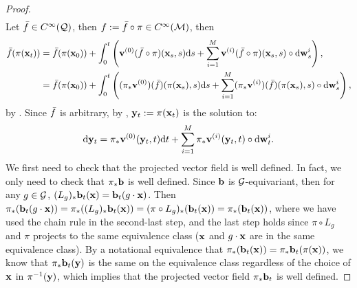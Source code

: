 \begin{proof}
\begin{align}
    \end{align}
    Let $\bar{f}\in C^\infty(\mathcal{Q})$, then $f := \bar{f}\circ\pi\in C^\infty(\mathcal{M})$, then 
    \begin{align}
        \bar{f}(\pi(\mathbf{x}_t))
        &=\bar{f}(\pi(\mathbf{x}_0))+\int_0^t\left(\mathbf{v}^{(0)}(\bar{f}\circ\pi)(\mathbf{x}_s,s)\mathrm{d} s+\sum_{i=1}^M \mathbf{v}^{(i)}(\bar{f}\circ\pi)(\mathbf{x}_s,s)\circ\mathrm{d} \mathbf{w}_s^i\right),\\
        &=\bar{f}(\pi(\mathbf{x}_0))+\int_0^t\left((\pi_*\mathbf{v}^{(0)})(\bar{f})(\pi(\mathbf{x}_s),s)\mathrm{d} s+\sum_{i=1}^M(\pi_*\mathbf{v}^{(i)})(\bar{f})(\pi(\mathbf{x}_s),s)\circ\mathrm{d} \mathbf{w}_s^i\right),
    \end{align}
    by . Since $\bar{f}$ is arbitrary, by , $\mathbf{y}_t:=\pi(\mathbf{x}_t)$ is the solution to:
    \begin{align}
        \mathrm{d}\mathbf{y}_t=\pi_*\mathbf{v}^{(0)}(\mathbf{y}_t,t)\mathrm{d} t+\sum_{i=1}^{M}\pi_*\mathbf{v}^{(i)}(\mathbf{y}_t,t)\circ\mathrm{d} \mathbf{w}_t^i.
    \end{align}
    We first need to check that the projected vector field is well defined. In fact, we only need to check that $\pi_*\mathbf{b}$ is well defined. Since $\mathbf{b}$ is $\mathcal{G}$-equivariant, then for any $g\in\mathcal{G}$,
    $(L_g)_*\mathbf{b}_t(\mathbf{x})=\mathbf{b}_t(g\cdot\mathbf{x})$. Then $\pi_*(\mathbf{b}_t(g\cdot\mathbf{x}))=\pi_*((L_g)_*\mathbf{b}_t(\mathbf{x}))=(\pi\circ L_g)_*(\mathbf{b}_t(\mathbf{x})) = \pi_*(\mathbf{b}_t(\mathbf{x}))$, where we have used the chain rule in the second-last step, and the last step holds since $\pi \circ L_g$ and $\pi$ projects to the same equivalence class ($\mathbf{x}$ and $g \cdot \mathbf{x}$ are in the same equivalence class). By a notational equivalence that $\pi_*(\mathbf{b}_t(\mathbf{x})) = \pi_*\mathbf{b}_t (\pi(\mathbf{x}))$, we know that $\pi_* \mathbf{b}_t (\mathbf{y})$ is the same on the equivalence class regardless of the choice of $\mathbf{x}$ in $\pi^{-1}(\mathbf{y})$, which implies that the projected vector field $\pi_* \mathbf{b}_t$ is well defined.


\end{proof}
